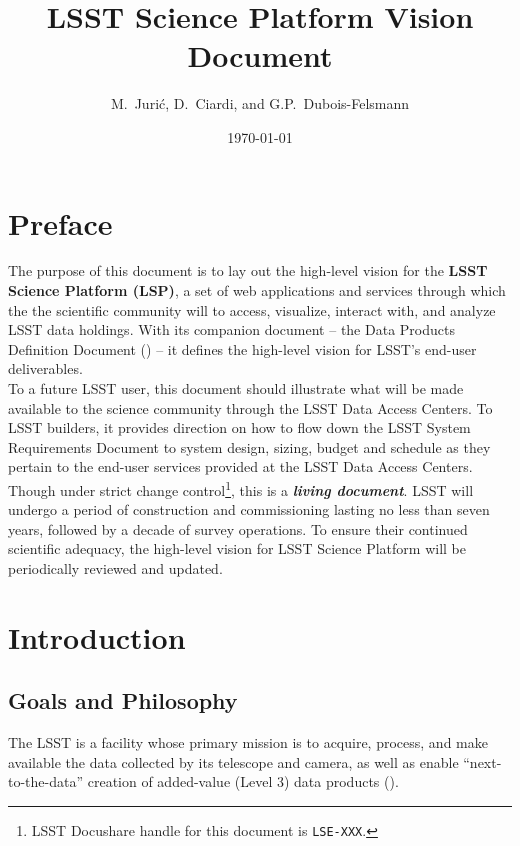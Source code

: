 \documentclass[DM,lsstdraft,toc]{lsstdoc}
\title[LSST Science Platform]{LSST Science Platform Vision Document}
\author{
M.~Juri\'c,
D.~Ciardi,
and
G.P.~Dubois-Felsmann
}
\date{\today}
\begin{document}
\maketitle

\section{Preface}

The purpose of this document is to lay out the high-level vision for the {\bf LSST Science Platform (LSP)}, a set of web applications and services through which the the scientific community will to access, visualize, interact with, and analyze LSST data holdings. With its companion document -- the Data Products Definition Document (\DPDD) -- it defines the high-level vision for LSST's end-user deliverables.
\\

To a future LSST user, this document should illustrate what will be made available to the science community through the LSST Data Access Centers. To LSST builders, it provides direction on how to flow down the LSST System Requirements Document to system design, sizing, budget and schedule as they pertain to the end-user services provided at the LSST Data Access Centers.
\\

Though under strict change control\footnote{LSST Docushare handle for this document is {\tt LSE-XXX}.}, this is a {\bf \em living document}. LSST will undergo a period of construction  and commissioning lasting no less than seven years, followed by a decade of survey operations. To ensure their continued scientific adequacy, the high-level vision for LSST Science Platform will be periodically reviewed and updated.

\clearpage

\section{Introduction}

\subsection{Goals and Philosophy}

The LSST is a facility whose primary mission is to acquire, process, and
make available the data collected by its telescope and camera, as well as
enable ``next-to-the-data'' creation of added-value (Level 3) data products
(\SRD).
\end{document}
